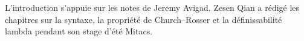 \documentclass[../../include/open-logic-part]{subfiles}
\begin{document}
\begin{OLPartNotice}{}
L'introduction s'appuie sur les notes de Jeremy Avigad. Zesen Qian
a rédigé les chapitres sur la syntaxe, la propriété de Church--Rosser
et la définissabilité lambda pendant son stage d'été Mitacs.
\end{OLPartNotice}





\OLEndPartHook
\end{document}
